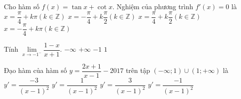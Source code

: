\begin{ex}%
	Cho hàm số $f(x)=\tan x +\cot x$. Nghiệm của phương trình $f'(x)=0$ là
	\choice
	{$x=\dfrac{\pi}{4}+k\pi(k\in \mathbb{Z})$}
	{$x=-\dfrac{\pi}{4}+k\dfrac{\pi}{2}(k\in \mathbb{Z})$}
	{\True $x=\dfrac{\pi}{4}+k\dfrac{\pi}{2}(k\in \mathbb{Z})$}
	{$x=-\dfrac{\pi}{4}+k\pi(k\in \mathbb{Z})$}
\end{ex}

\begin{ex}%
Tính $\lim\limits_{x\rightarrow -1^-}\dfrac{1-x}{x+1}$.
	\choice
	{\True $-\infty$}
	{$+\infty$}
	{$-1$}
	{$1$}
\end{ex}

\begin{ex}%
	Đạo hàm của hàm số $y=\dfrac{2x+1}{x-1}-2017$ trên tập $(-\infty;1)\cup (1;+\infty)$ là
	\choice
	{\True $y'=\dfrac{-3}{(x-1)^2}$}
	{$y'=\dfrac{1}{(x-1)^2}$}
	{$y'=\dfrac{3}{(x-1)^2}$}
	{$y'=\dfrac{-1}{(x-1)^2}$}
\end{ex}

